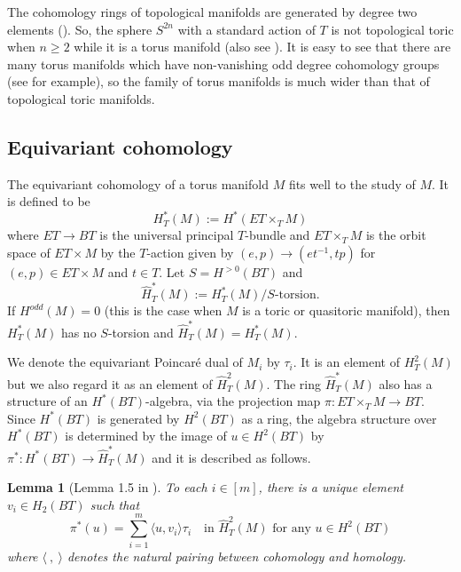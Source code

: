 \documentclass[12pt]{amsart}
\theoremstyle{plain} \numberwithin{equation}{section}
\newtheorem{lemm}[theo]{Lemma}
\theoremstyle{definition}
\renewcommand{\H}{\hat H}
\begin{document}
The cohomology rings of topological manifolds are generated by degree two elements (\cite[Proposition 8.3]{is-fu-ma13}).  So, the sphere $S^{2n}$ with a standard action of $T$ is not topological toric when $n\ge 2$ while it is a torus manifold (also see \cite{kuro13}).  It is easy to see that there are many torus manifolds which have non-vanishing odd degree cohomology groups (see \cite[Section 11]{is-fu-ma13} for example), so the family of torus manifolds is much wider than that of topological toric manifolds.  

\subsection{Equivariant cohomology}

The equivariant cohomology of a torus manifold $M$ fits well to the study of $M$.  
It is defined to be 
\[
H^*_T(M):=H^*(ET\times_T M)
\]
where $ET\to BT$ is the universal principal $T$-bundle and $ET\times_T M$ is the orbit space 
of $ET\times M$ by the $T$-action given by $(e,p)\to (et^{-1},tp)$ for $(e,p)\in ET\times M$ and $t\in T$.  
Let $S=H^{>0}(BT)$ and 
\[
\H^*_T(M):=H^*_T(M)/S\text{-torsion}.
\]
If $H^{odd}(M)=0$ (this is the case when $M$ is a toric or quasitoric manifold), then 
$H^*_T(M)$ has no $S$-torsion and $\H^*_T(M)=H^*_T(M)$.  

We denote the equivariant Poincar\'e dual of $M_i$ by $\tau_i$.  It is an element of $H^2_T(M)$ but we also regard it as an element of $\H^2_T(M)$.    The ring $\H^*_T(M)$ also has a structure of an $H^*(BT)$-algebra, via the projection map $\pi\colon ET\times_T M\to BT$.  Since $H^*(BT)$ is generated by $H^2(BT)$ as a ring, the algebra structure over $H^*(BT)$ is determined by the image of $u\in H^2(BT)$ by $\pi^*\colon H^*(BT)\to \H^*_T(M)$ and it is described as follows. 

\begin{lemm}[Lemma 1.5 in \cite{masu99}] \label{lemm:3-1}
To each $i\in [m]$, there is a unique element $v_i\in H_2(BT)$ such that  
\begin{equation} \label{eq:3-1}
\pi^*(u)=\sum_{i=1}^m \langle u,v_i\rangle \tau_i \quad \text{in $\H^2_T(M)$ for any $u\in H^2(BT)$}
\end{equation}
where $\langle\ ,\ \rangle$ denotes the natural pairing between cohomology and homology.
\end{lemm}
\end{document}
